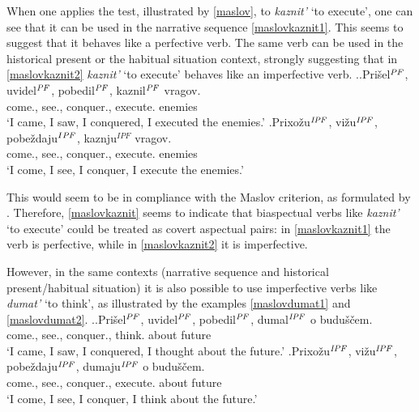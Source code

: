 When one applies the test, illustrated by \ref{maslov}, to \textit{kaznit'} `to execute', one can see that it can be used in the narrative sequence  \ref{maslovkaznit1}. This seems to suggest that it behaves like a perfective verb. The same verb can be used in the historical present or the habitual situation context, strongly suggesting that in \ref{maslovkaznit2} \textit{kaznit'} `to execute' behaves like an imperfective verb.
\ex.\label{maslovkaznit}\ag.\label{maslovkaznit1}Pri\v{s}el$^{{\mathit{PF}}}$, uvidel$^{{\mathit{PF}}}$, pobedil$^{{\mathit{PF}}}$, kaznil$^{{\mathit{PF}}}$ vragov.\\
come., see., conquer., execute. enemies\\
\vspace{0.5em}
`I came, I saw, I conquered, I executed the enemies.'
\bg.\label{maslovkaznit2}Prixo\v{z}u$^{{\mathit{IPF}}}$, vi\v{z}u$^{{\mathit{IPF}}}$, pobe\v{z}daju$^{I{\mathit{PF}}}$, kaznju$^{IPF}$ vragov.\\
come., see., conquer., execute. enemies\\
\vspace{0.5em}
`I come, I see, I conquer, I execute the enemies.'

This would seem to be in compliance with the Maslov criterion, as formulated by \citet{Mikaelian:07}. Therefore, \ref{maslovkaznit} seems to indicate that biaspectual verbs like \textit{kaznit'} `to execute' could be treated as covert aspectual pairs: in \ref{maslovkaznit1} the verb is perfective, while in \ref{maslovkaznit2} it is imperfective.

However, in the same contexts (narrative sequence and historical present\slash habitual situation) it is also possible to use imperfective verbs like \textit{dumat'} `to think', as illustrated by the examples \ref{maslovdumat1} and \ref{maslovdumat2}.
\ex.\label{maslovdumat}\ag.\label{maslovdumat1}Pri\v{s}el$^{{\mathit{PF}}}$, uvidel$^{{\mathit{PF}}}$, pobedil$^{{\mathit{PF}}}$, dumal$^{{\mathit{IPF}}}$ o budu\v{s}\v{c}em.\\
come., see., conquer., think. about future\\
\vspace{0.5em}
`I came, I saw, I conquered, I thought about the future.'
\bg.\label{maslovdumat2}Prixo\v{z}u$^{{\mathit{IPF}}}$, vi\v{z}u$^{{\mathit{IPF}}}$, pobe\v{z}daju$^{{\mathit{IPF}}}$, dumaju$^{{\mathit{IPF}}}$ o budu\v{s}\v{c}em.\\
come., see., conquer., execute. about future\\
\vspace{0.5em}
`I come, I see, I conquer, I think about the future.'

